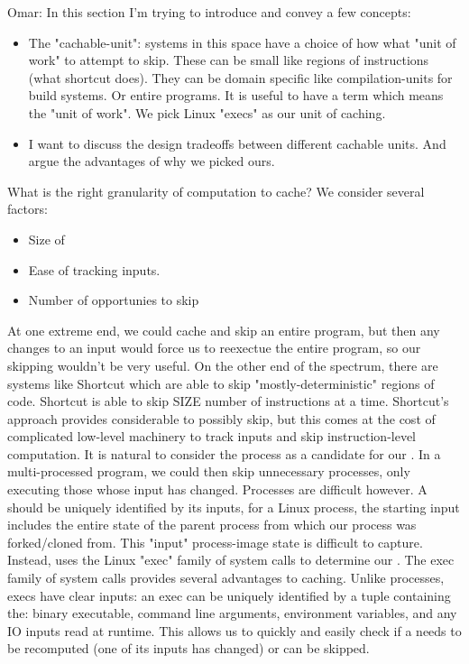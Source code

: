 Omar: In this section I'm trying to introduce and convey a few concepts:
\begin{itemize}
  \item The "cachable-unit": systems in this space have a choice of how what "unit of work" to attempt to skip. These can be small like regions of instructions (what shortcut does). They can be domain specific like compilation-units for build systems. Or entire programs. It is useful to have a term which means the "unit of work". We pick Linux "execs" as our unit of caching.
  \item I want to discuss the design tradeoffs between different cachable units. And argue the advantages of why we picked ours.
  \end{itemize}

What is the right granularity of computation to cache? We consider several factors:

\begin{itemize}
  \item Size of \cacheunit
  \item Ease of tracking \cacheunit inputs.
  \item Number of opportunies to skip \cacheunit
\end{itemize}

At one extreme end, we could cache and skip an entire program, but then any changes to an input would force us to reexectue the entire program, so our skipping wouldn't be very useful. On the other end of the spectrum, there are systems like Shortcut which are able to skip "mostly-deterministic" regions of code. Shortcut is able to skip SIZE number of instructions at a time. Shortcut's approach provides considerable \cacheunit to possibly skip, but this comes at the cost of complicated low-level machinery to track inputs and skip instruction-level computation.
It is natural to consider the process as a candidate for our \cacheunit. In a multi-processed program,
  we could then skip unnecessary processes, only executing those whose input has changed. Processes are difficult
  however. A \cacheunit should be uniquely identified by its inputs, for a Linux process, the starting input
  includes the entire state of the parent process from which our process was forked/cloned from. This "input" process-image state is difficult to capture. 
Instead, \pc uses the Linux "exec" family of system calls to determine our \cacheunit. The exec family of system calls provides several advantages to caching. Unlike processes, execs have clear inputs: an exec can
be uniquely identified by a tuple containing the: binary executable, command line arguments, environment variables, and any IO inputs read at runtime. This allows us to quickly and easily check if a \cacheunit needs
to be recomputed (one of its inputs has changed) or can be skipped.

